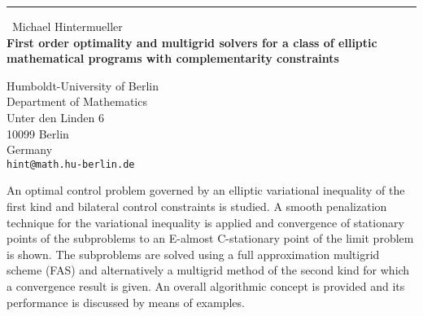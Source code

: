 \documentclass{report}
\begin{document}
\begin{center}
\rule{6in}{1pt} \
{\large Michael Hintermueller \\
{\bf First order optimality and multigrid solvers for a class of elliptic mathematical programs with complementarity constraints}}

Humboldt-University of Berlin \\ Department of Mathematics \\ Unter den Linden 6 \\ 10099 Berlin \\ Germany
\\
{\tt hint@math.hu-berlin.de}\end{center}

An optimal control problem governed by an elliptic variational inequality
of the first kind and bilateral control constraints is studied. A smooth
penalization technique for the variational inequality is applied and
convergence of stationary
points of the subproblems to an E-almost C-stationary point of the limit
problem is shown. The subproblems are solved using a full approximation
multigrid scheme (FAS) and alternatively a multigrid method of the second
kind for which a convergence result is given. An overall algorithmic
concept is provided and its performance
is discussed by means of examples.
\end{document}
